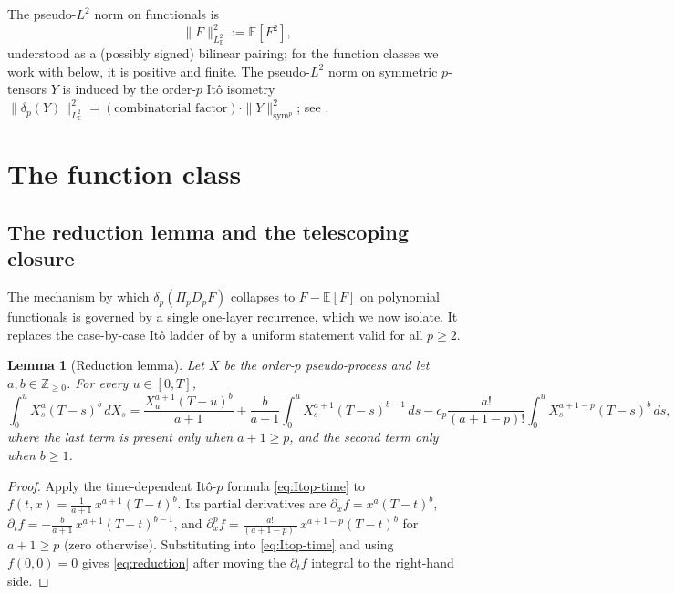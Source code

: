 \documentclass[11pt,reqno]{amsart}
\theoremstyle{plain}
\newtheorem{lemma}[theorem]{Lemma}
\theoremstyle{definition}
\newcommand{\E}{\mathbb{E}}
\newcommand{\Z}{\mathbb{Z}}
\newcommand{\sym}{\mathrm{sym}}
\begin{document}
The pseudo-$L^2$ norm on functionals is
\begin{equation}
\label{eq:pseudoL2}
\|F\|_{L^2_\E}^2 := \E[F^2],
\end{equation}
understood as a (possibly signed) bilinear pairing; for the function classes we work with below, it is positive and finite. The pseudo-$L^2$ norm on symmetric $p$-tensors $Y$ is induced by the order-$p$ Itô isometry $\|\delta_p(Y)\|_{L^2_\E}^2 = (\text{combinatorial factor}) \cdot \|Y\|_{\sym^p}^2$; see \cite[\S 3]{operatorDerivativeII}.

\section{The function class}

\subsection{The reduction lemma and the telescoping closure}
\label{sec:reduction}

The mechanism by which $\delta_p(\Pi_p D_p F)$ collapses to $F - \E[F]$ on polynomial functionals is governed by a single one-layer recurrence, which we now isolate. It replaces the case-by-case Itô ladder of \cite{operatorDerivativeII} by a uniform statement valid for all $p \geq 2$.

\begin{lemma}[Reduction lemma]
\label{lem:reduction}
Let $X$ be the order-$p$ pseudo-process and let $a, b \in \Z_{\geq 0}$. For every $u \in [0,T]$,
\begin{equation}
\label{eq:reduction}
\int_0^u X_s^{a}(T-s)^{b}\, dX_s
= \frac{X_u^{a+1}(T-u)^{b}}{a+1}
+ \frac{b}{a+1}\int_0^u X_s^{a+1}(T-s)^{b-1}\, ds
- c_p \frac{a!}{(a+1-p)!}\int_0^u X_s^{a+1-p}(T-s)^{b}\, ds,
\end{equation}
where the last term is present only when $a+1 \geq p$, and the second term only when $b \geq 1$.
\end{lemma}

\begin{proof}
Apply the time-dependent Itô-$p$ formula \eqref{eq:Itop-time} to
$f(t,x) = \tfrac{1}{a+1}\, x^{a+1}(T-t)^{b}$.
Its partial derivatives are
$\partial_x f = x^{a}(T-t)^{b}$,
$\partial_t f = -\tfrac{b}{a+1}\,x^{a+1}(T-t)^{b-1}$, and
$\partial_x^p f = \tfrac{a!}{(a+1-p)!}\,x^{a+1-p}(T-t)^{b}$ for $a+1 \geq p$ (zero otherwise).
Substituting into \eqref{eq:Itop-time} and using $f(0,0)=0$ gives \eqref{eq:reduction} after moving the $\partial_t f$ integral to the right-hand side.
\end{proof}
\end{document}
